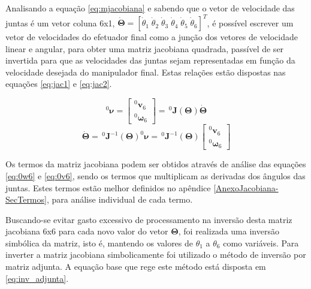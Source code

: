 Analisando a equação \ref{eq:mjacobiana} e sabendo que o vetor de velocidade das juntas
é um vetor coluna 6x1, $\dot{\boldsymbol{\Theta}} = [\dot{\theta}_1 \; \dot{\theta}_2 \; \dot{\theta}_3 \; \dot{\theta}_4 \; \dot{\theta}_5 \; \dot{\theta}_6]^T$,
é possível escrever um vetor de velocidades do efetuador final como a junção dos vetores de velocidade linear
e angular, para obter uma matriz jacobiana quadrada, passível de ser invertida para que as velocidades das juntas
sejam representadas em função da velocidade desejada do manipulador final. Estas relações estão dispostas nas equações 
\ref{eq:jac1} e \ref{eq:jac2}.

\begin{multicols}{2}
    \noindent
    \begin{equation}
        \label{eq:jac1}
        ^0\boldsymbol{\nu} = \begin{bmatrix}
                    ^0\textbf{v}_6 \\
                    ^0\boldsymbol{\omega}_6
                \end{bmatrix}
              = \,^0\!\textbf{J}(\boldsymbol{\Theta})\dot{\boldsymbol{\Theta}}
    \end{equation}
    \noindent
    \begin{equation}
        \label{eq:jac2}
        \dot{\boldsymbol{\Theta}} = \,^0\!\textbf{J}^{-1}(\boldsymbol{\Theta})^0\boldsymbol{\nu} = \,^0\!\textbf{J}^{-1}(\boldsymbol{\Theta})\begin{bmatrix}
                                                                            ^0\textbf{v}_6 \\
                                                                            ^0\boldsymbol{\omega}_6
                                                                        \end{bmatrix}
    \end{equation}
\end{multicols}

Os termos da matriz jacobiana podem ser obtidos através de análise das equações \ref{eq:0w6} e \ref{eq:0v6},
sendo os termos que multiplicam as derivadas dos ângulos das juntas. Estes termos estão melhor definidos
no apêndice \ref{AnexoJacobiana-SecTermos}, para análise individual de cada termo.

Buscando-se evitar gasto excessivo de processamento na inversão desta matriz jacobiana 6x6 para cada
novo valor do vetor $\boldsymbol{\Theta}$, foi realizada uma inversão simbólica da matriz, isto é, mantendo os 
valores de $\theta_1$ a $\theta_6$ como variáveis. Para inverter a matriz jacobiana simbolicamente foi utilizado o 
método de inversão por matriz adjunta. A equação base que rege este método está disposta em \ref{eq:inv_adjunta}.

